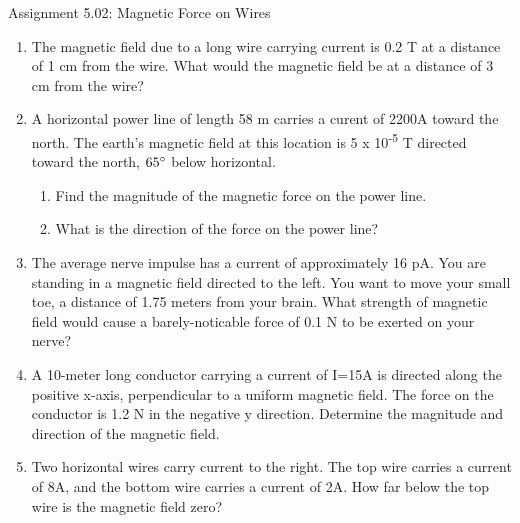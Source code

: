 \documentclass[letterpaper, 12pt]{article}
\begin{document}
	

	
\begin{center}Assignment 5.02: Magnetic Force on Wires
\end{center}

\begin{enumerate}




	\item The magnetic field due to a long wire carrying current is 0.2 T at a distance of 1 cm from the wire. What would the magnetic field be at a distance of 3 cm from the wire?
	\vspace{1in}
	\item A horizontal power line of length 58 m carries a curent of 2200A toward the north.  The earth's magnetic field at this location is 5 x 10\textsuperscript{-5} T directed toward the north, $65 \degree$  below horizontal. 
	\begin{enumerate}
		\item Find the magnitude of the magnetic force on the power line.
		\vspace{.8in}
		\item What is the direction of the force on the power line?
		\vspace{.8in}
	\end{enumerate}

	\item The average nerve impulse has a current of approximately 16 pA.  You are standing in a magnetic field directed to the left.  You want to move your small toe, a distance of 1.75 meters from your brain. What strength of magnetic field would cause a barely-noticable force of 0.1 N to be exerted on your nerve?  
	
	\vspace{.9in}
	
	\item A 10-meter long conductor carrying a current of I=15A is directed along the positive x-axis, perpendicular to a uniform magnetic field.  The force on the conductor is 1.2 N in the negative y direction.  Determine the magnitude and direction of the magnetic field. 
	\vspace{1.5in}
	
	\item Two horizontal wires carry current to the right.  The top wire carries a current of 8A, and the bottom wire carries a current of 2A.  How far below the top wire is the magnetic field zero?
	

\end{enumerate}
\end{document}
